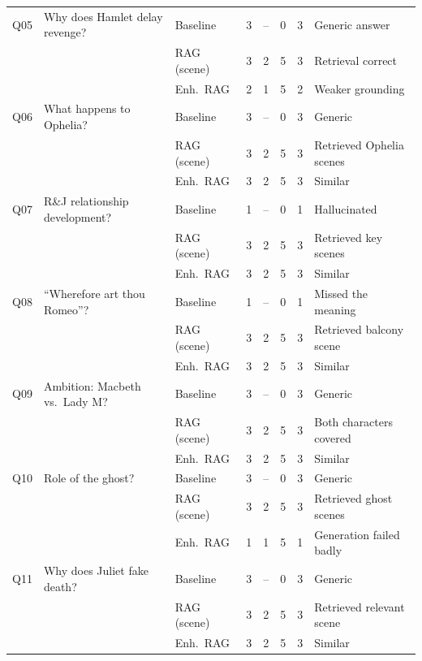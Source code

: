 \begin{longtable}{@{}p{0.7cm} p{4.3cm} p{2.5cm} c c c c p{4.2cm}@{}}
\midrule
Q05 & Why does Hamlet delay revenge? & Baseline   & 3 & -- & 0 & 3 & Generic answer \\
    &                                & RAG (scene)& 3 & 2  & 5 & 3 & Retrieval correct \\
    &                                & Enh.\ RAG  & 2 & 1  & 5 & 2 & Weaker grounding \\
\midrule
Q06 & What happens to Ophelia? & Baseline   & 3 & -- & 0 & 3 & Generic \\
    &                          & RAG (scene)& 3 & 2  & 5 & 3 & Retrieved Ophelia scenes \\
    &                          & Enh.\ RAG  & 3 & 2  & 5 & 3 & Similar \\
\midrule
Q07 & R\&J relationship development? & Baseline   & 1 & -- & 0 & 1 & Hallucinated \\
    &                                & RAG (scene)& 3 & 2  & 5 & 3 & Retrieved key scenes \\
    &                                & Enh.\ RAG  & 3 & 2  & 5 & 3 & Similar \\
\midrule
Q08 & ``Wherefore art thou Romeo''? & Baseline   & 1 & -- & 0 & 1 & Missed the meaning \\
    &                               & RAG (scene)& 3 & 2  & 5 & 3 & Retrieved balcony scene \\
    &                               & Enh.\ RAG  & 3 & 2  & 5 & 3 & Similar \\
\midrule
Q09 & Ambition: Macbeth vs.\ Lady M? & Baseline   & 3 & -- & 0 & 3 & Generic \\
    &                                & RAG (scene)& 3 & 2  & 5 & 3 & Both characters covered \\
    &                                & Enh.\ RAG  & 3 & 2  & 5 & 3 & Similar \\
\midrule
Q10 & Role of the ghost? & Baseline   & 3 & -- & 0 & 3 & Generic \\
    &                    & RAG (scene)& 3 & 2  & 5 & 3 & Retrieved ghost scenes \\
    &                    & Enh.\ RAG  & 1 & 1  & 5 & 1 & Generation failed badly \\
\midrule
Q11 & Why does Juliet fake death? & Baseline   & 3 & -- & 0 & 3 & Generic \\
    &                             & RAG (scene)& 3 & 2  & 5 & 3 & Retrieved relevant scene \\
    &                             & Enh.\ RAG  & 3 & 2  & 5 & 3 & Similar \\

\end{longtable}
